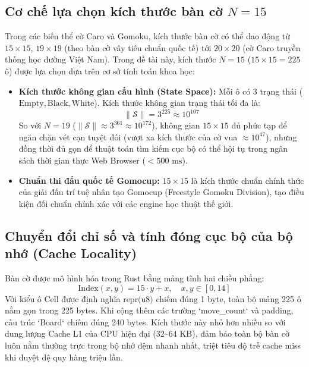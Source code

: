 \documentclass[11pt,a4paper]{report}
\begin{document}
\subsection{Cơ chế lựa chọn kích thước bàn cờ $N = 15$}
Trong các biến thể cờ Caro và Gomoku, kích thước bàn cờ có thể dao động từ $15 \times 15$, $19 \times 19$ (theo bàn cờ vây tiêu chuẩn quốc tế) tới $20 \times 20$ (cờ Caro truyền thống học đường Việt Nam). Trong đề tài này, kích thước $N = 15$ ($15 \times 15 = 225$ ô) được lựa chọn dựa trên cơ sở tính toán khoa học:
\begin{itemize}
    \item \textbf{Kích thước không gian cấu hình (State Space):} Mỗi ô có 3 trạng thái ($\text{Empty}, \text{Black}, \text{White}$). Kích thước không gian trạng thái tối đa là:
    \begin{equation}
        \|\mathcal{S}\| = 3^{225} \approx 10^{107}
    \end{equation}
    So với $N = 19$ ($\|\mathcal{S}\| \approx 3^{361} \approx 10^{172}$), không gian $15 \times 15$ đủ phức tạp để ngăn chặn vét cạn tuyệt đối (vượt xa kích thước của cờ vua $\approx 10^{47}$), nhưng đồng thời đủ gọn để thuật toán tìm kiếm cục bộ có thể hội tụ trong ngân sách thời gian thực Web Browser ($< 500\text{ ms}$).
    \item \textbf{Chuẩn thi đấu quốc tế Gomocup:} $15 \times 15$ là kích thước chuẩn chính thức của giải đấu trí tuệ nhân tạo Gomocup (Freestyle Gomoku Division), tạo điều kiện đối chuẩn chính xác với các engine học thuật thế giới.
\end{itemize}

\subsection{Chuyển đổi chỉ số và tính đóng cục bộ của bộ nhớ (Cache Locality)}
Bàn cờ được mô hình hóa trong Rust bằng mảng tĩnh hai chiều phẳng:
\begin{equation}
    \text{Index}(x, y) = 15 \cdot y + x, \quad x, y \in [0, 14]
\end{equation}
Với kiểu ô $\text{Cell}$ được định nghĩa $\text{repr(u8)}$ chiếm đúng 1 byte, toàn bộ mảng 225 ô nằm gọn trong 225 bytes. Khi cộng thêm các trường `move\_count` và padding, cấu trúc `Board` chiếm đúng 240 bytes. Kích thước này nhỏ hơn nhiều so với dung lượng Cache L1 của CPU hiện đại ($32\text{--}64\text{ KB}$), đảm bảo toàn bộ bàn cờ luôn nằm thường trực trong bộ nhớ đệm nhanh nhất, triệt tiêu độ trễ cache miss khi duyệt đệ quy hàng triệu lần.
\end{document}
